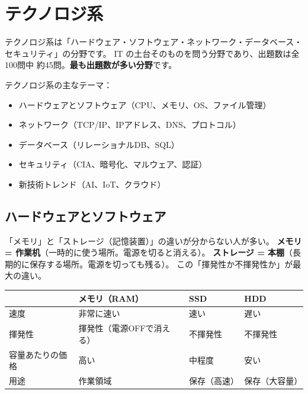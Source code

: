 \chapter{テクノロジ系}

テクノロジ系は「ハードウェア・ソフトウェア・ネットワーク・データベース・セキュリティ」の分野です。
IT の土台そのものを問う分野であり、出題数は全100問中 約45問。\textbf{最も出題数が多い分野}です。

\begin{keypoint}
テクノロジ系の主なテーマ：
\begin{itemize}
  \item ハードウェアとソフトウェア（CPU、メモリ、OS、ファイル管理）
  \item ネットワーク（TCP/IP、IPアドレス、DNS、プロトコル）
  \item データベース（リレーショナルDB、SQL）
  \item セキュリティ（CIA、暗号化、マルウェア、認証）
  \item 新技術トレンド（AI、IoT、クラウド）
\end{itemize}
\end{keypoint}

\section{ハードウェアとソフトウェア}

\mondaipage
{}

\begin{stumble}
「メモリ」と「ストレージ（記憶装置）」の違いが分からない人が多い。
\textbf{メモリ = 作業机}（一時的に使う場所。電源を切ると消える）。
\textbf{ストレージ = 本棚}（長期的に保存する場所。電源を切っても残る）。
この「揮発性か不揮発性か」が最大の違い。
\end{stumble}

\begin{comparison}
\begin{tabularx}{\textwidth}{lXXX}
  \toprule
  & \textbf{メモリ（RAM）} & \textbf{SSD} & \textbf{HDD} \\
  \midrule
  速度 & 非常に速い & 速い & 遅い \\
  揮発性 & 揮発性（電源OFFで消える） & 不揮発性 & 不揮発性 \\
  容量あたりの価格 & 高い & 中程度 & 安い \\
  用途 & 作業領域 & 保存（高速） & 保存（大容量） \\
  \bottomrule
\end{tabularx}
\end{comparison}

